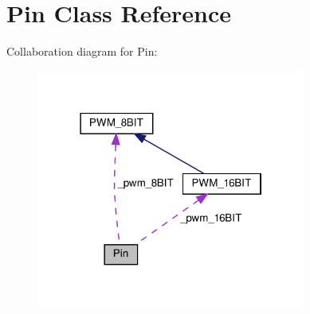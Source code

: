\hypertarget{classPin}{}\section{Pin Class Reference}
\label{classPin}


Collaboration diagram for Pin\+:\nopagebreak
\begin{figure}[H]
\begin{center}
\leavevmode
\includegraphics[width=250pt]{classPin__coll__graph}
\end{center}
\end{figure}
